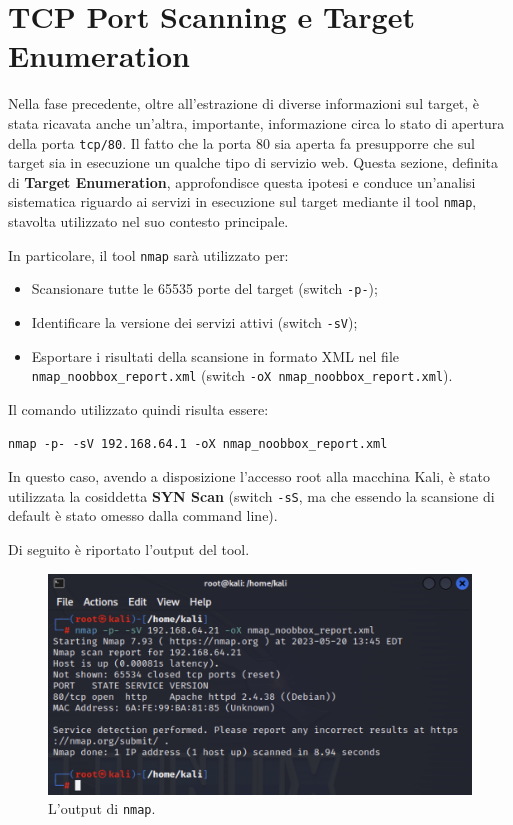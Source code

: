 \documentclass[a4paper, 12pt, oneside]{article}
\begin{document}
\section{TCP Port Scanning e Target Enumeration}

Nella fase precedente, oltre all'estrazione di diverse informazioni sul target, è stata ricavata anche un'altra, importante, informazione circa lo stato di apertura della porta \texttt{tcp/80}. Il fatto che la porta 80 sia aperta fa presupporre che sul target sia in esecuzione un qualche tipo di servizio web. Questa sezione, definita di \textbf{Target Enumeration}, approfondisce questa ipotesi e conduce un'analisi sistematica riguardo ai servizi in esecuzione sul target mediante il tool \texttt{nmap}, stavolta utilizzato nel suo contesto principale.

In particolare, il tool \texttt{nmap} sarà utilizzato per:

\begin{itemize}
    \item Scansionare tutte le 65535 porte del target (switch \texttt{-p-});
    \item Identificare la versione dei servizi attivi (switch \texttt{-sV});
    \item Esportare i risultati della scansione in formato XML nel file \texttt{nmap\_noobbox\_report.xml} (switch \texttt{-oX nmap\_noobbox\_report.xml}).
\end{itemize}

Il comando utilizzato quindi risulta essere:

\begin{center}
    \texttt{nmap -p- -sV 192.168.64.1 -oX nmap\_noobbox\_report.xml}
\end{center}

In questo caso, avendo a disposizione l'accesso root alla macchina Kali, è stato utilizzata la cosiddetta \textbf{SYN Scan} (switch \texttt{-sS}, ma che essendo la scansione di default è stato omesso dalla command line).

Di seguito è riportato l'output del tool.

\begin{figure}[h!]
    \centering
    \includegraphics[width=\textwidth]{img/nmap-enum.png}
    \caption{L'output di \texttt{nmap}.}
\end{figure}
\end{document}
